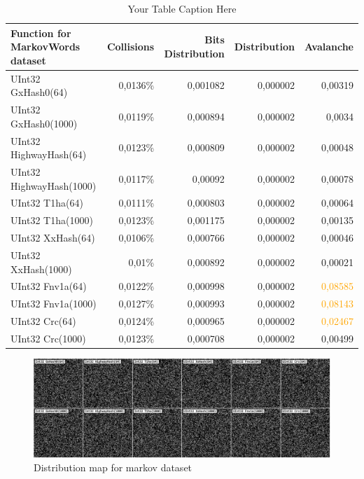 \documentclass[10pt]{article}
\begin{document}
\begin{table}[H]
\centering
\begin{tabular}{|l|r|r|r|r|}
\hline
\textbf{Function for MarkovWords dataset} & \textbf{Collisions} & \textbf{Bits Distribution} & \textbf{Distribution} & \textbf{Avalanche} \\
\hline
UInt32 GxHash0(64)                & 0,0136\% & 0,001082  & 0,000002 & 0,00319 \\
UInt32 GxHash0(1000)              & 0,0119\% & 0,000894  & 0,000002 & 0,0034 \\
UInt32 HighwayHash(64)            & 0,0123\% & 0,000809  & 0,000002 & 0,00048 \\
UInt32 HighwayHash(1000)          & 0,0117\% & 0,00092   & 0,000002 & 0,00078 \\
UInt32 T1ha(64)                   & 0,0111\% & 0,000803  & 0,000002 & 0,00064 \\
UInt32 T1ha(1000)                 & 0,0123\% & 0,001175  & 0,000002 & 0,00135 \\
UInt32 XxHash(64)                & 0,0106\% & 0,000766  & 0,000002 & 0,00046 \\
UInt32 XxHash(1000)              & 0,01\%   & 0,000892  & 0,000002 & 0,00021 \\
UInt32 Fnv1a(64)                 & 0,0122\% & 0,000998  & 0,000002 & \textcolor{orange}{0,08585} \\
UInt32 Fnv1a(1000)               & 0,0127\% & 0,000993  & 0,000002 & \textcolor{orange}{0,08143} \\
UInt32 Crc(64)                   & 0,0124\% & 0,000965  & 0,000002 & \textcolor{orange}{0,02467} \\
UInt32 Crc(1000)                 & 0,0123\% & 0,000708  & 0,000002 & 0,00499 \\
\hline
\end{tabular}
\caption{Your Table Caption Here}
\label{tab:my_label}
\end{table}

\begin{figure}[H]
\centering
\includegraphics[width=1\textwidth]{quality-markov.png}
\caption{Distribution map for markov dataset}
\label{fig:quality-sequential}
\end{figure}
\end{document}
